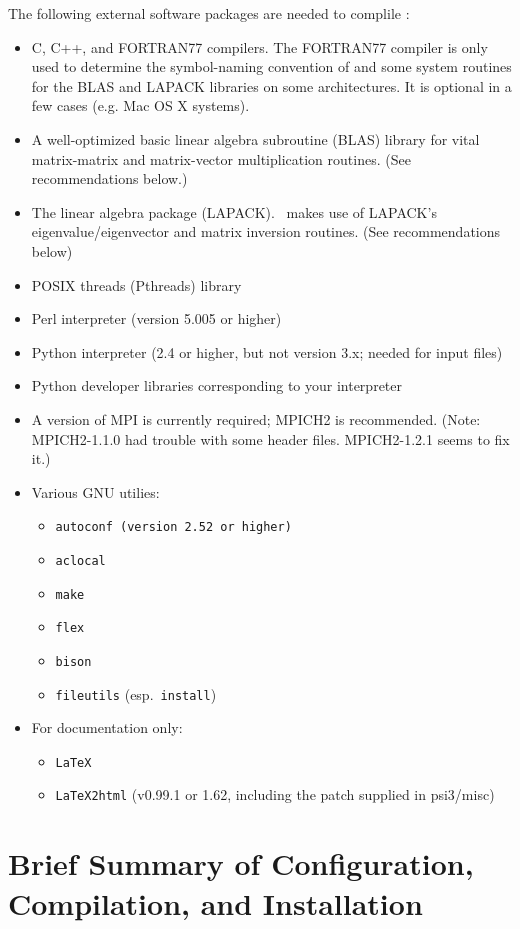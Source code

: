 \documentclass[12pt]{article}
\begin{document}
The following external software packages are needed to complile \PSIfour:
\begin{itemize}
\item C, C++, and FORTRAN77 compilers. The FORTRAN77 compiler is only
  used to determine the symbol-naming convention of and some system
  routines for the BLAS and LAPACK libraries on some architectures. It
  is optional in a few cases (e.g. Mac OS X systems).
\item A well-optimized basic linear algebra subroutine (BLAS) library
  for vital matrix-matrix and matrix-vector multiplication
  routines. (See recommendations below.)
\item The linear algebra package (LAPACK).  \PSIfour\ makes use of
  LAPACK's eigenvalue/eigenvector and matrix inversion routines.  (See
  recommendations below)
\item POSIX threads (Pthreads) library
\item Perl interpreter (version 5.005 or higher)
\item Python interpreter (2.4 or higher, but not version 3.x; 
      needed for input files)
\item Python developer libraries corresponding to your interpreter
\item A version of MPI is currently required; MPICH2 is recommended.
  (Note: MPICH2-1.1.0 had trouble with some header files.  MPICH2-1.2.1
  seems to fix it.)
\item Various GNU utilies: 
\begin{itemize}
\item {\tt autoconf (version 2.52 or higher)}
\item {\tt aclocal}
\item {\tt make}
\item {\tt flex}
\item {\tt bison}
\item {\tt fileutils} (esp.\ {\tt install})
\end{itemize}
\item For documentation only:
\begin{itemize}
\item {\tt LaTeX}
\item {\tt LaTeX2html} (v0.99.1 or 1.62, including the patch supplied in
psi3/misc)
\end{itemize}
\end{itemize}

\section{Brief Summary of Configuration, Compilation, and Installation}
\end{document}
